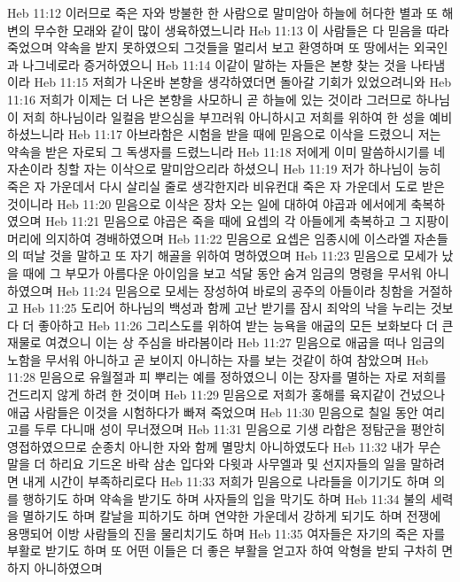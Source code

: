Heb 11:12  이러므로 죽은 자와 방불한 한 사람으로 말미암아 하늘에 허다한 별과 또 해변의 무수한 모래와 같이 많이 생육하였느니라
Heb 11:13  이 사람들은 다 믿음을 따라 죽었으며 약속을 받지 못하였으되 그것들을 멀리서 보고 환영하며 또 땅에서는 외국인과 나그네로라 증거하였으니
Heb 11:14  이같이 말하는 자들은 본향 찾는 것을 나타냄이라
Heb 11:15  저희가 나온바 본향을 생각하였더면 돌아갈 기회가 있었으려니와
Heb 11:16  저희가 이제는 더 나은 본향을 사모하니 곧 하늘에 있는 것이라 그러므로 하나님이 저희 하나님이라 일컬음 받으심을 부끄러워 아니하시고 저희를 위하여 한 성을 예비하셨느니라
Heb 11:17  아브라함은 시험을 받을 때에 믿음으로 이삭을 드렸으니 저는 약속을 받은 자로되 그 독생자를 드렸느니라
Heb 11:18  저에게 이미 말씀하시기를 네 자손이라 칭할 자는 이삭으로 말미암으리라 하셨으니
Heb 11:19  저가 하나님이 능히 죽은 자 가운데서 다시 살리실 줄로 생각한지라 비유컨대 죽은 자 가운데서 도로 받은 것이니라
Heb 11:20  믿음으로 이삭은 장차 오는 일에 대하여 야곱과 에서에게 축복하였으며
Heb 11:21  믿음으로 야곱은 죽을 때에 요셉의 각 아들에게 축복하고 그 지팡이 머리에 의지하여 경배하였으며
Heb 11:22  믿음으로 요셉은 임종시에 이스라엘 자손들의 떠날 것을 말하고 또 자기 해골을 위하여 명하였으며
Heb 11:23  믿음으로 모세가 났을 때에 그 부모가 아름다운 아이임을 보고 석달 동안 숨겨 임금의 명령을 무서워 아니하였으며
Heb 11:24  믿음으로 모세는 장성하여 바로의 공주의 아들이라 칭함을 거절하고
Heb 11:25  도리어 하나님의 백성과 함께 고난 받기를 잠시 죄악의 낙을 누리는 것보다 더 좋아하고
Heb 11:26  그리스도를 위하여 받는 능욕을 애굽의 모든 보화보다 더 큰 재물로 여겼으니 이는 상 주심을 바라봄이라
Heb 11:27  믿음으로 애굽을 떠나 임금의 노함을 무서워 아니하고 곧 보이지 아니하는 자를 보는 것같이 하여 참았으며
Heb 11:28  믿음으로 유월절과 피 뿌리는 예를 정하였으니 이는 장자를 멸하는 자로 저희를 건드리지 않게 하려 한 것이며
Heb 11:29  믿음으로 저희가 홍해를 육지같이 건넜으나 애굽 사람들은 이것을 시험하다가 빠져 죽었으며
Heb 11:30  믿음으로 칠일 동안 여리고를 두루 다니매 성이 무너졌으며
Heb 11:31  믿음으로 기생 라합은 정탐군을 평안히 영접하였으므로 순종치 아니한 자와 함께 멸망치 아니하였도다
Heb 11:32  내가 무슨 말을 더 하리요 기드온 바락 삼손 입다와 다윗과 사무엘과 및 선지자들의 일을 말하려면 내게 시간이 부족하리로다
Heb 11:33  저희가 믿음으로 나라들을 이기기도 하며 의를 행하기도 하며 약속을 받기도 하며 사자들의 입을 막기도 하며
Heb 11:34  불의 세력을 멸하기도 하며 칼날을 피하기도 하며 연약한 가운데서 강하게 되기도 하며 전쟁에 용맹되어 이방 사람들의 진을 물리치기도 하며
Heb 11:35  여자들은 자기의 죽은 자를 부활로 받기도 하며 또 어떤 이들은 더 좋은 부활을 얻고자 하여 악형을 받되 구차히 면하지 아니하였으며
